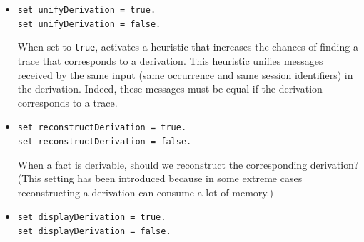 \documentclass{book}
\begin{document}
\begin{itemize}
Moreover, for \lstinline{noninterf} and \lstinline{choice}, it reconstructs
a trace, but this trace may not always prove that the property is
wrong: for \lstinline{noninterf}, it reconstructs a trace until a program
point at which the process behaves differently depending on the value
of the secret (takes a different branch of a test, for instance), but
this different behavior is not always observable by the attacker;
similarly, for \lstinline{choice}, it reconstructs a trace until a
program point at which the process using the first argument of
\lstinline{choice} behaves differently from the process using the second
argument of \lstinline{choice}.


\item \lstinline{set unifyDerivation = true.}\\
\lstinline{set unifyDerivation = false.}

When set to \lstinline{true}, activates a heuristic that increases the
chances of finding a trace that corresponds to a derivation.
This heuristic unifies messages received by the same input
(same occurrence and same session identifiers) in the derivation.
Indeed, these messages must be equal if the derivation corresponds to
a trace.

\item \lstinline{set reconstructDerivation = true.}\\
\lstinline{set reconstructDerivation = false.}

When a fact is derivable, should we reconstruct the corresponding
derivation? (This setting has been introduced because in some extreme
cases reconstructing a derivation can consume a lot of memory.)

\item \lstinline{set displayDerivation = true.}\\
\lstinline{set displayDerivation = false.}


\end{itemize}
\end{document}
